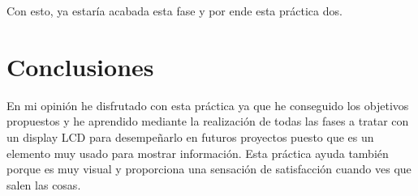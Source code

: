\documentclass[11pt,a4paper]{article}
\begin{document}
	 Con esto, ya estaría acabada esta fase y por ende esta práctica dos.
	
	\section{Conclusiones}
	En mi opinión he disfrutado con esta práctica ya que he conseguido los objetivos propuestos y he aprendido mediante la realización de todas las fases a tratar con un display LCD para desempeñarlo en futuros proyectos puesto que es un elemento muy usado para mostrar información. Esta práctica ayuda también porque es muy visual y proporciona una sensación de satisfacción cuando ves que salen las cosas.
\end{document}
